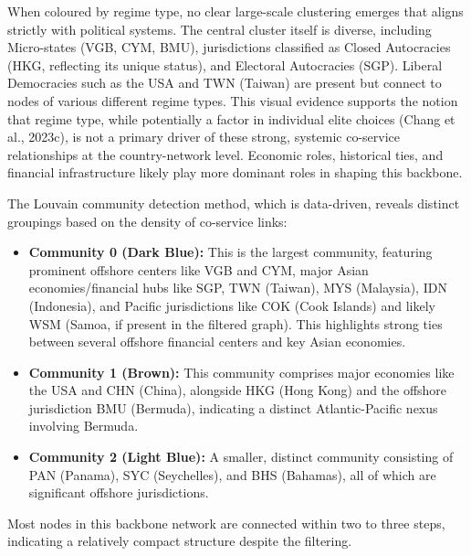 When coloured by regime type, no clear large-scale clustering emerges that aligns strictly with political systems. The central cluster itself is diverse, including Micro-states (VGB, CYM, BMU), jurisdictions classified as Closed Autocracies (HKG, reflecting its unique status), and Electoral Autocracies (SGP). Liberal Democracies such as the USA and TWN (Taiwan) are present but connect to nodes of various different regime types. This visual evidence supports the notion that regime type, while potentially a factor in individual elite choices (Chang et al., 2023c), is not a primary driver of these strong, systemic co-service relationships at the country-network level. Economic roles, historical ties, and financial infrastructure likely play more dominant roles in shaping this backbone.

The Louvain community detection method, which is data-driven, reveals distinct groupings based on the density of co-service links:
\begin{itemize}
    \item \textbf{Community 0 (Dark Blue):} This is the largest community, featuring prominent offshore centers like VGB and CYM, major Asian economies/financial hubs like SGP, TWN (Taiwan), MYS (Malaysia), IDN (Indonesia), and Pacific jurisdictions like COK (Cook Islands) and likely WSM (Samoa, if present in the filtered graph). This highlights strong ties between several offshore financial centers and key Asian economies.
    \item \textbf{Community 1 (Brown):} This community comprises major economies like the USA and CHN (China), alongside HKG (Hong Kong) and the offshore jurisdiction BMU (Bermuda), indicating a distinct Atlantic-Pacific nexus involving Bermuda.
    \item \textbf{Community 2 (Light Blue):} A smaller, distinct community consisting of PAN (Panama), SYC (Seychelles), and BHS (Bahamas), all of which are significant offshore jurisdictions.
\end{itemize}
Most nodes in this backbone network are connected within two to three steps, indicating a relatively compact structure despite the filtering.

